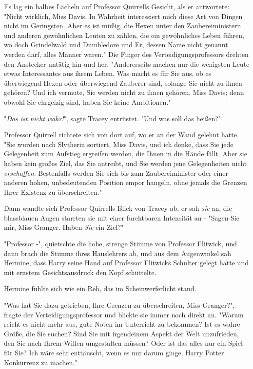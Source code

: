 {Es lag ein halbes Lächeln auf Professor Quirrells Gesicht, als er antwortete: "Nicht wirklich, Miss Davis. In Wahrheit interessiert mich diese Art von Dingen nicht im Geringsten. Aber es ist müßig, die Hexen unter den Zaubereiministern und anderen gewöhnlichen Leuten zu zählen, die ein gewöhnliches Leben führen, wo doch Grindelwald und Dumbledore und Er, dessen Name nicht genannt werden darf, alles Männer waren." Die Finger des Verteidigungsprofessors drehten den Anstecker untätig hin und her. "Andererseits machen nur die wenigsten Leute etwas Interessantes aus ihrem Leben. Was macht es für Sie aus, ob es überwiegend Hexen oder überwiegend Zauberer sind, solange Sie nicht zu ihnen gehören? Und ich vermute, Sie werden nicht zu ihnen gehören, Miss Davis; denn obwohl Sie ehrgeizig sind, haben Sie keine Ambitionen."

"\emph{Das ist nicht wahr!}", sagte Tracey entrüstet. "Und was soll das heißen?"

Professor Quirrell richtete sich von dort auf, wo er an der Wand gelehnt hatte. "Sie wurden nach Slytherin sortiert, Miss Davis, und ich denke, dass Sie jede Gelegenheit zum Aufstieg ergreifen werden, die Ihnen in die Hände fällt. Aber sie haben kein großes Ziel, das Sie antreibt, und Sie werden jene Gelegenheiten nicht \emph{erschaffen}. Bestenfalls werden Sie sich bis zum Zaubereiminister oder einer anderen hohen, unbedeutenden Position empor hangeln, ohne jemals die Grenzen Ihrer Existenz zu überschreiten."

Dann wandte sich Professor Quirrells Blick von Tracey ab, er sah \emph{sie} an, die blassblauen Augen starrten sie mit einer furchtbaren Intensität an - "Sagen Sie mir, Miss Granger. Haben \emph{Sie} ein Ziel?"

"Professor -", quietschte die hohe, strenge Stimme von Professor Flitwick, und dann brach die Stimme ihres Hauslehrers ab, und aus dem Augenwinkel sah Hermine, dass Harry seine Hand auf Professor Flitwicks Schulter gelegt hatte und mit ernstem Gesichtsausdruck den Kopf schüttelte.

Hermine fühlte sich wie ein Reh, das im Scheinwerferlicht stand.

"Was hat Sie dazu getrieben, Ihre Grenzen zu überschreiten, Miss Granger?", fragte der Verteidigungsprofessor und blickte sie immer noch direkt an. "Warum reicht es nicht mehr aus, gute Noten im Unterricht zu bekommen? Ist es wahre Größe, die Sie suchen? Sind Sie mit irgendeinem Aspekt der Welt unzufrieden, den Sie nach Ihrem Willen umgestalten müssen? Oder ist das alles nur ein Spiel für Sie? Ich wäre sehr enttäuscht, wenn es nur darum ginge, Harry Potter Konkurrenz zu machen."

}
